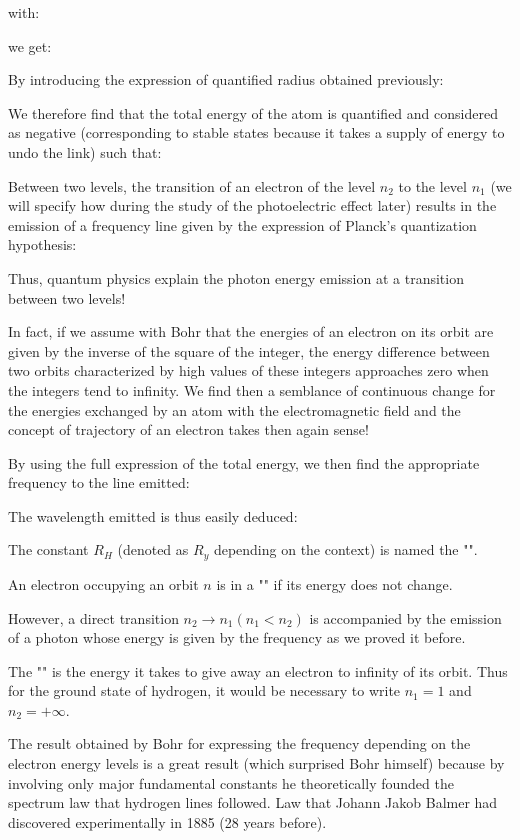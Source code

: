 with:
	
we get:
	
By introducing the expression of quantified radius obtained previously:
	
	
We therefore find that the total energy of the atom is quantified and considered as negative (corresponding to stable states because it takes a supply of energy to undo the link) such that:
	
Between two levels, the transition of an electron of the level $n_2$ to the level $n_1$ (we will specify how during the study of the photoelectric effect later) results in the emission of a frequency line given by the expression of Planck's quantization hypothesis:
	
Thus, quantum physics explain the photon energy emission at a transition between two levels!

In fact, if we assume with Bohr that the energies of an electron on its orbit are given by the inverse of the square of the integer, the energy difference between two orbits characterized by high values of these integers approaches zero when the integers tend to infinity. We find then a semblance of continuous change for the energies exchanged by an atom with the electromagnetic field and the concept of trajectory of an electron takes then again sense!

By using the full expression of the total energy, we then find the appropriate frequency to the line emitted:
	
The wavelength emitted is thus easily deduced:
	
The constant $R_H$ (denoted as $R_y$ depending on the context) is named the "".

An electron occupying an orbit $n$ is in a "" if its energy does not change.

However, a direct transition $n_2 \rightarrow n_1 (n_1<n_2)$ is accompanied by the emission of a photon whose energy is given by the frequency as we proved it before.

The "" is the energy it takes to give away an electron to infinity of its orbit. Thus for the ground state of hydrogen, it would be necessary to write $n_1=1$ and $n_2=+\infty$.

The result obtained by Bohr for expressing the frequency depending on the electron energy levels is a great result (which surprised Bohr himself) because by involving only major fundamental constants he theoretically founded the spectrum law that hydrogen lines followed. Law that Johann Jakob Balmer had discovered experimentally in 1885 (28 years before).

